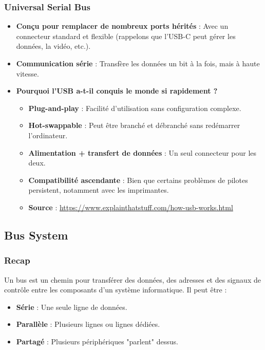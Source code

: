 \documentclass[10pt,a4paper]{article}
\begin{document}
\subsubsection*{Universal Serial Bus}
\begin{itemize}
    \item \textbf{Conçu pour remplacer de nombreux ports hérités} : Avec un connecteur standard et flexible (rappelons que l'USB-C peut gérer les données, la vidéo, etc.).
    \item \textbf{Communication série} : Transfère les données un bit à la fois, mais à haute vitesse.
    \item \textbf{Pourquoi l'USB a-t-il conquis le monde si rapidement ?}
    \begin{itemize}
        \item \textbf{Plug-and-play} : Facilité d'utilisation sans configuration complexe.
        \item \textbf{Hot-swappable} : Peut être branché et débranché sans redémarrer l'ordinateur.
        \item \textbf{Alimentation + transfert de données} : Un seul connecteur pour les deux.
        \item \textbf{Compatibilité ascendante} : Bien que certains problèmes de pilotes persistent, notamment avec les imprimantes.
    \end{itemize}
    \begin{itemize}
        \item \textbf{Source} : \url{https://www.explainthatstuff.com/how-usb-works.html}
    \end{itemize}
\end{itemize}

\subsection*{Bus System}

\subsubsection*{Recap}
Un bus est un chemin pour transférer des données, des adresses et des signaux de contrôle entre les composants d'un système informatique. Il peut être :
\begin{itemize}
    \item \textbf{Série} : Une seule ligne de données.
    \item \textbf{Parallèle} : Plusieurs lignes ou lignes dédiées.
    \item \textbf{Partagé} : Plusieurs périphériques "parlent" dessus.
\end{itemize}
\end{document}
